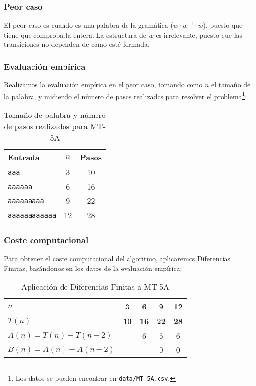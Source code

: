 

\subsubsection*{Peor caso}
El peor caso es cuando es una palabra de la gramática ($w \cdot w^{-1} \cdot w$), puesto que tiene que comprobarla entera. La estructura de $w$ es irrelevante, puesto que las transiciones no dependen de cómo esté formada.

\subsubsection*{Evaluación empírica}
Realizamos la evaluación empírica en el peor caso, tomando como $n$ el tamaño de la palabra, y midiendo el número de pasos realizados para resolver el problema\footnote{Los datos se pueden encontrar en \texttt{data/MT-5A.csv}.}:

\begin{table}[h]
    \centering
    \begin{tabular}{lcc}
        Entrada & $n$ & Pasos \\
        \hline
        \texttt{aaa}                &  3  & 10 \\
        \texttt{aaaaaa}             &  6  & 16 \\
        \texttt{aaaaaaaaa}          &  9  & 22 \\
        \texttt{aaaaaaaaaaaa}       & 12  & 28 \\
    \end{tabular}
    \caption{Tamaño de palabra y número de pasos realizados para MT-5A}
\end{table}


\subsubsection*{Coste computacional}
Para obtener el coste computacional del algoritmo, aplicaremos Diferencias Finitas, basándonos en los datos de la evaluación empírica:

\begin{table}[H]
    \centering
    \begin{tabular}{|l|c|c|c|c|}
        \hline
        $n$    & \textbf{3}  & \textbf{6}  & \textbf{9}  & \textbf{12} \\ \hline
        $T(n)$ & \textbf{10} & \textbf{16} & \textbf{22} & \textbf{28} \\ \hline
        \hline
        $A(n) = T(n) - T(n-2)$ &   & 6 & 6 & 6 \\ \hline
        $B(n) = A(n) - A(n-2)$ &   &   & 0 & 0 \\ \hline
    \end{tabular}
    \label{tab:5A}
    \caption{Aplicación de Diferencias Finitas a MT-5A}
\end{table}

